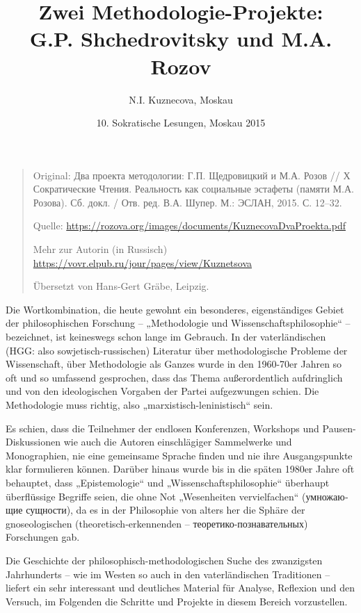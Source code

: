 \documentclass[11pt,a4paper]{article}
\title{Zwei Methodologie-Projekte:\\ G.P. Shchedrovitsky und M.A. Rozov}
\author{N.I. Kuznecova, Moskau}
\date{10. Sokratische Lesungen, Moskau 2015}
\begin{document}
\maketitle
\begin{quote}
  Original: \foreignlanguage{russian}{ Два проекта методологии:
    Г.П. Щедровицкий и М.А. Розов // Х Сократические Чтения. Реальность как
    социальные эстафеты (памяти М.А. Розова). Сб. докл. /
    Отв. ред. В.А. Шупер. М.: ЭСЛАН, 2015. С. 12–32.}
  
  Quelle: \url{https://rozova.org/images/documents/KuznecovaDvaProekta.pdf}

  Mehr zur Autorin (in Russisch)\\
  \url{https://vovr.elpub.ru/jour/pages/view/Kuznetsova}

  Übersetzt von Hans-Gert Gräbe, Leipzig. 
\end{quote}

Die Wortkombination, die heute gewohnt ein besonderes, eigenständiges Gebiet
der philosophischen Forschung -- „Methodologie und Wissenschaftsphilosophie“
-- bezeichnet, ist keineswegs schon lange im Gebrauch.  In der vaterländischen
(HGG: also sowjetisch-russischen) Literatur über methodologische Probleme der
Wissenschaft, über Methodologie als Ganzes wurde in den 1960-70er Jahren so
oft und so umfassend gesprochen, dass das Thema außerordentlich aufdringlich
und von den ideologischen Vorgaben der Partei aufgezwungen schien.  Die
Methodologie muss richtig, also „marxistisch-leninistisch“ sein.

Es schien, dass die Teilnehmer der endlosen Konferenzen, Workshops und
Pausen-Diskussio\-nen wie auch die Autoren einschlägiger Sammelwerke und
Monographien, nie eine gemeinsame Sprache finden und nie ihre Ausgangspunkte
klar formulieren können. Darüber hinaus wurde bis in die späten 1980er Jahre
oft behauptet, dass „Epistemologie“ und „Wissenschaftsphilosophie“ überhaupt
überflüssige Begriffe seien, die ohne Not „Wesenheiten vervielfachen“
(\foreignlanguage{russian}{умножающие сущности}), da es in der Philosophie von
alters her die Sphäre der gnoseologischen (theoretisch-erkennenden --
\foreignlanguage{russian}{теоретико-познавательных}) Forschungen gab.

Die Geschichte der philosophisch-methodologischen Suche des zwanzigsten
Jahrhunderts -- wie im Westen so auch in den vaterländischen Traditionen --
liefert ein sehr interessant und deutliches Material für Analyse, Reflexion
und den Versuch, im Folgenden die Schritte und Projekte in diesem Bereich
vorzustellen.
\newpage
\end{document}
